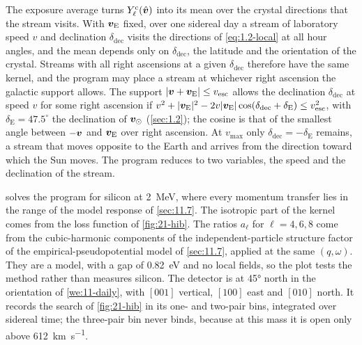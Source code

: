 The exposure average turns $Y^{\mathrm{c}}_\ell(\hat{\bm{v}})$ into its mean over the crystal directions that the stream visits. With $\bm{v}_{\mathrm{E}}$ fixed, over one sidereal day a stream of laboratory speed $v$ and declination $\delta_{\mathrm{dec}}$ visits the directions of \cref{eq:1.2-local} at all hour angles, and the mean depends only on $\delta_{\mathrm{dec}}$, the latitude and the orientation of the crystal. Streams with all right ascensions at a given $\delta_{\mathrm{dec}}$ therefore have the same kernel, and the program may place a stream at whichever right ascension the galactic support allows. The support $|\bm{v} + \bm{v}_{\mathrm{E}}| \le v_{\mathrm{esc}}$ allows the declination $\delta_{\mathrm{dec}}$ at speed $v$ for some right ascension if $v^2 + |\bm{v}_{\mathrm{E}}|^2 - 2v|\bm{v}_{\mathrm{E}}|\cos(\delta_{\mathrm{dec}} + \delta_{\mathrm{E}}) \le v_{\mathrm{esc}}^2$, with $\delta_{\mathrm{E}} = 47.5^\circ$ the declination of $\bm{v}_\odot$ (\cref{sec:1.2}); the cosine is that of the smallest angle between $-\bm{v}$ and $\bm{v}_{\mathrm{E}}$ over right ascension. At $v_{\mathrm{max}}$ only $\delta_{\mathrm{dec}} = -\delta_{\mathrm{E}}$ remains, a stream that moves opposite to the Earth and arrives from the direction toward which the Sun moves. The program reduces to two variables, the speed and the declination of the stream.

 solves the program for silicon at \SI{2}{MeV}, where every momentum transfer lies in the range of the model response of \cref{sec:11.7}. The isotropic part of the kernel comes from the loss function of \cref{fig:21-hib}. The ratios $a_\ell$ for $\ell = 4, 6, 8$ come from the cubic-harmonic components of the independent-particle structure factor of the empirical-pseudopotential model of \cref{sec:11.7}, applied at the same $(q,\omega)$. They are a model, with a gap of \SI{0.82}{eV} and no local fields, so the plot tests the method rather than measures silicon. The detector is at \ang{45} north in the orientation of \cref{we:11-daily}, with $[001]$ vertical, $[100]$ east and $[010]$ north. It records the search of \cref{fig:21-hib} in its one- and two-pair bins, integrated over sidereal time; the three-pair bin never binds, because at this mass it is open only above \SI{612}{km.s^{-1}}.

